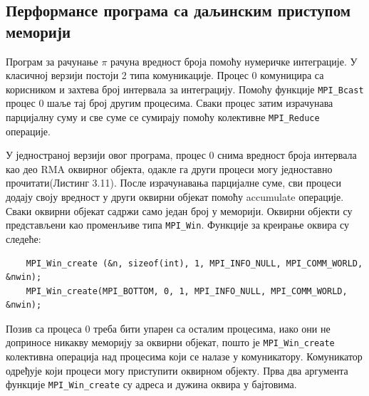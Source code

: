\subsection{Перформансе програма са даљинским приступом меморији}

Програм за рачунање $\pi$ рачуна вредност броја помоћу нумеричке интеграције. У класичној  верзији постоји 2 типа комуникације. Процес 0 комуницира са корисником и захтева број интервала за интеграцију. Помоћу функције \texttt{MPI\_Bcast} процес 0 шаље тај број другим процесима. Сваки процес затим израчунава парцијалну суму и све суме се сумирају помоћу колективне \texttt{MPI\_Reduce} операције.

У једностраној верзији овог програма, процес 0 снима вредност броја интервала као део RMA оквирног објекта, одакле га други процеси могу једноставно прочитати(Листинг 3.11). После израчунавања парцијалне суме, сви процеси додају своју вредност у други оквирни објекат помоћу accumulate операције. Сваки оквирни објекат садржи само један број у меморији. Оквирни објекти су представљени као променљиве типа \texttt{MPI\_Win}. Функције за креирање оквира су следеће:

\begin{verbatim}
	MPI_Win_create (&n, sizeof(int), 1, MPI_INFO_NULL, MPI_COMM_WORLD, &nwin);
	MPI_Win_create(MPI_BOTTOM, 0, 1, MPI_INFO_NULL, MPI_COMM_WORLD, &nwin);
\end{verbatim}

Позив са процеса 0 треба бити упарен са осталим процесима, иако они не доприносе никакву меморију за оквирни објекат, пошто је \texttt{MPI\_Win\_create} колективна операција над процесима који се налазе у комуникатору. Комуникатор одређује који процеси могу приступити оквирном објекту. Прва два аргумента функције  \texttt{MPI\_Win\_create} су адреса и дужина оквира у бајтовима.

